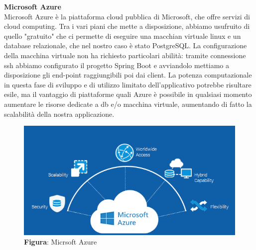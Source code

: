 \begin{flushleft}
    \textbf{Microsoft Azure}\\
    Microsoft Azure è la piattaforma cloud pubblica di Microsoft, che offre servizi di cloud computing. Tra i vari piani che mette a disposizione, abbiamo usufruito
    di quello "gratuito" che ci permette di eseguire una macchian virtuale linux e un database relazionale, che nel nostro caso è stato PostgreSQL.
    La configurazione della macchina virtuale non ha richiesto particolari abilità: tramite connessione ssh abbiamo configurato il progetto Spring Boot e avviandolo 
    mettiamo a disposizione gli end-point raggiungibili poi dai client.
    La potenza computazionale in questa fase di sviluppo e di utilizzo limitato dell'applicativo potrebbe risultare esile, ma il vantaggio di piattaforme quali
    Azure è possibile in qualsiasi momento aumentare le risorse dedicate a db e/o macchina virtuale, aumentando di fatto la scalabilità della nostra applicazione.

\end{flushleft}

\begin{figure}[H]
    \centering
    \includegraphics[scale=0.5]{assets/immagini varie/azure loc.png}
    \caption*{\textbf{Figura}: Micrsoft Azure}\label{fig:mic_az}
\end{figure}
